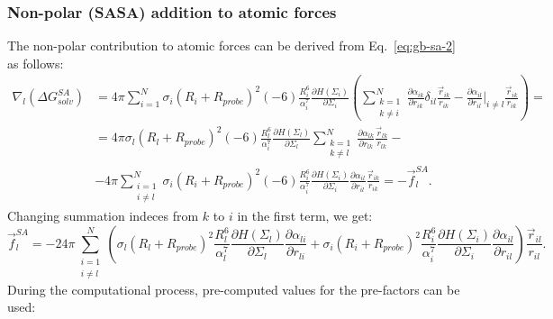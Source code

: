 \documentclass[11pt]{book}
\begin{document}

\subsubsection{Non-polar (SASA) addition to atomic forces}

The non-polar contribution to atomic forces can be derived from Eq.~\ref{eq:gb-sa-2} as follows:
\begin{equation}\label{eq:gb-sa-f-1}
\begin{split}
\nabla_{l} (\Delta G^{SA}_{solv})&=4\pi\sum_{i=1}^{N}\sigma_{i}\left(R_{i}+R_{probe}\right)^{2}\left(-6\right)\frac{R_{i}^{6}}{\alpha_{i}^{7}}\frac{\partial H(\Sigma_{i})}{\partial\Sigma_{i}}\left(\sum_{\substack{k=1\\k\ne i}}^{N}\frac{\partial\alpha_{ik}}{\partial r_{ik}}\delta_{il}\frac{\vec{r}_{ik}}{r_{ik}}-\frac{\partial\alpha_{il}}{\partial r_{il}}\bigg|_{i\ne l}\frac{\vec{r}_{ik}}{r_{ik}}\right)=\\
&=4\pi\sigma_{l}\left(R_{l}+R_{probe}\right)^{2}\left(-6\right)\frac{R_{l}^{6}}{\alpha_{i}^{7}}\frac{\partial H(\Sigma_{l})}{\partial\Sigma_{l}}\sum_{\substack{k=1\\k\ne l}}^{N}\frac{\partial\alpha_{lk}}{\partial r_{lk}}\frac{\vec{r}_{lk}}{r_{lk}}-\\
&-4\pi\sum_{\substack{i=1\\i\ne l}}^{N}\sigma_{i}\left(R_{i}+R_{probe}\right)^{2}\left(-6\right)\frac{R_{i}^{6}}{\alpha_{i}^{7}}\frac{\partial H(\Sigma_{i})}{\partial\Sigma_{i}}\frac{\partial\alpha_{il}}{\partial r_{il}}\frac{\vec{r}_{ik}}{r_{ik}}=-\vec{f}_{l}^{SA}.
\end{split}
\end{equation}
Changing summation indeces from $k$ to $i$ in the first term, we get:
\begin{equation}\label{eq:gb-sa-f-2}
\vec{f}_{l}^{SA}=-24\pi\sum_{\substack{i=1\\i\ne l}}^{N}\left(\sigma_{l}\left(R_{l}+R_{probe}\right)^{2}\frac{R_{l}^{6}}{\alpha_{l}^{7}}\frac{\partial H(\Sigma_{l})}{\partial\Sigma_{l}}\frac{\partial\alpha_{li}}{\partial r_{li}}+\sigma_{i}\left(R_{i}+R_{probe}\right)^{2}\frac{R_{i}^{6}}{\alpha_{i}^{7}}\frac{\partial H(\Sigma_{i})}{\partial\Sigma_{i}}\frac{\partial\alpha_{il}}{\partial r_{il}}\right)\frac{\vec{r}_{il}}{r_{il}}.
\end{equation}
During the computational process, pre-computed values for the pre-factors can be used:
\end{document}

